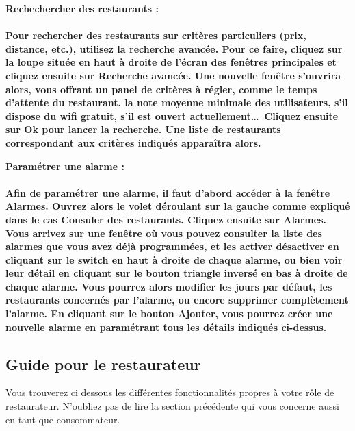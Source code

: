 \begin{description}
    \item \bf{Rechechercher des restaurants :} \\ \\
        Pour rechercher des restaurants sur critères particuliers (prix, distance, etc.), utilisez la recherche avancée. Pour ce faire, cliquez sur la loupe située en haut à droite de l'écran des fenêtres principales et cliquez ensuite sur \og{}Recherche avancée\fg{}. Une nouvelle fenêtre s'ouvrira alors, vous offrant un panel de critères à régler, comme le temps d'attente du restaurant, la note moyenne minimale des utilisateurs, s'il dispose du wifi gratuit, s'il est ouvert actuellement\dots~Cliquez ensuite sur \og{}Ok\fg{} pour lancer la recherche. Une liste de restaurants correspondant aux critères indiqués apparaîtra alors. \\
        
    \item \bf{Paramétrer une alarme :} \\ \\
        Afin de paramétrer une alarme, il faut d'abord accéder à la fenêtre \og{}Alarmes\fg{}. Ouvrez alors le volet déroulant sur la gauche comme expliqué dans le cas \og{}Consuler des restaurants\fg{}. Cliquez ensuite sur \og{}Alarmes\fg{}. Vous arrivez sur une fenêtre où vous pouvez consulter la liste des alarmes que vous avez déjà programmées, et les activer désactiver en cliquant sur le switch en haut à droite de chaque alarme, ou bien voir leur détail en cliquant sur le bouton \og{}triangle inversé\fg{} en bas à droite de chaque alarme. Vous pourrez alors modifier les jours par défaut, les restaurants concernés par l'alarme, ou encore supprimer complètement l'alarme. En cliquant sur le bouton \og{}Ajouter\fg{}, vous pourrez créer une nouvelle alarme en paramétrant tous les détails indiqués ci-dessus.
        
\end{description}

\subsection{Guide pour le restaurateur}

Vous trouverez ci dessous les différentes fonctionnalités propres à votre rôle de restaurateur. N'oubliez pas de lire la section précédente qui vous concerne aussi en tant que consommateur. \\

